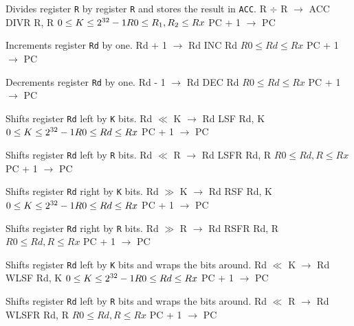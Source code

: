 \documentclass[titlepage]{scrartcl}
\begin{document}
{Divides register \texttt{R} by register \texttt{R} and stores the result in \texttt{ACC}.}
{R $\div$ R $\rightarrow$ ACC}
{DIVR R, R}
{$0 \leq K \leq 2^{32} - 1 \hfill \break R0 \leq R_{1}, R_{2} \leq Rx$}
{PC + 1 $\rightarrow$ PC}
{}
{}

{Increments register \texttt{Rd} by one.}
{Rd + 1 $\rightarrow$ Rd}
{INC Rd}
{$R0 \leq Rd \leq Rx$}
{PC + 1 $\rightarrow$ PC}
{}
{}

{Decrements register \texttt{Rd} by one.}
{Rd - 1 $\rightarrow$ Rd}
{DEC Rd}
{$R0 \leq Rd \leq Rx$}
{PC + 1 $\rightarrow$ PC}
{}
{}

{Shifts register \texttt{Rd} left by \texttt{K} bits.}
{Rd $\ll$ K $\rightarrow$ Rd}
{LSF Rd, K}
{$0 \leq K \leq 2^{32} - 1 \hfill \break R0 \leq Rd \leq Rx$}
{PC + 1 $\rightarrow$ PC}
{}
{}

{Shifts register \texttt{Rd} left by \texttt{R} bits.}
{Rd $\ll$ R $\rightarrow$ Rd}
{LSFR Rd, R}
{$R0 \leq Rd, R \leq Rx$}
{PC + 1 $\rightarrow$ PC}
{}
{}

{Shifts register \texttt{Rd} right by \texttt{K} bits.}
{Rd $\gg$ K $\rightarrow$ Rd}
{RSF Rd, K}
{$0 \leq K \leq 2^{32} - 1 \hfill \break R0 \leq Rd \leq Rx$}
{PC + 1 $\rightarrow$ PC}
{}
{}

{Shifts register \texttt{Rd} right by \texttt{R} bits.}
{Rd $\gg$ R $\rightarrow$ Rd}
{RSFR Rd, R}
{$R0 \leq Rd, R \leq Rx$}
{PC + 1 $\rightarrow$ PC}
{}
{}

{Shifts register \texttt{Rd} left by \texttt{K} bits and wraps the bits around.}
{Rd $\ll$ K $\rightarrow$ Rd}
{WLSF Rd, K}
{$0 \leq K \leq 2^{32} - 1 \hfill \break R0 \leq Rd \leq Rx$}
{PC + 1 $\rightarrow$ PC}
{}
{}

{Shifts register \texttt{Rd} left by \texttt{R} bits and wraps the bits around.}
{Rd $\ll$ R $\rightarrow$ Rd}
{WLSFR Rd, R}
{$R0 \leq Rd, R \leq Rx$}
{PC + 1 $\rightarrow$ PC}
{}
{}
\end{document}
